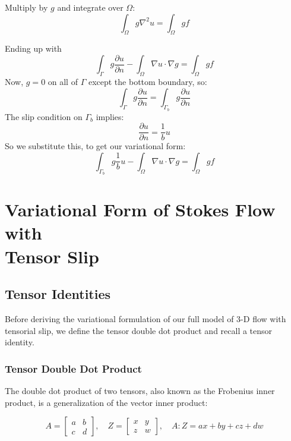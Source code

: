 \documentclass[12pt, a4paper, twoside, openright]{book}
\begin{document}
Multiply  by $g$ and integrate over $\Omega$:
\begin{equation}
\int_{\Omega} g \nabla^2 u = \int_{\Omega} g f
\end{equation}

Ending up with
\begin{equation}
\int_{\Gamma} g \frac{\partial u}{\partial n}
 - \int_{\Omega} \nabla u \cdot \nabla g  
= \int_{\Omega} g f
\end{equation}
Now, $g=0$ on all of $\Gamma$ except the bottom boundary, so:
\begin{equation}
\int_{\Gamma} g \frac{\partial u}{\partial n}
= \int_{\Gamma_b} g \frac{\partial u}{\partial n}
\end{equation}
The slip condition on $\Gamma_b$ implies:
\begin{equation}
\frac{\partial u}{\partial n} = \frac{1}{b}u
\end{equation}
So we substitute this, to get our variational form:
\begin{equation}
\int_{\Gamma_b} g \frac{1}{b} u 
 - \int_{\Omega} \nabla u \cdot \nabla g  
= \int_{\Omega} g f
\end{equation}


\section{Variational Form of Stokes Flow with\\ Tensor Slip}

\subsection{Tensor Identities}

Before deriving the variational formulation of our full model of 3-D flow with tensorial slip, we define the tensor double dot product and recall a tensor identity.

\subsubsection{Tensor Double Dot Product}

The double dot product of two tensors, also known as the Frobenius inner product, is a generalization of the vector inner product:

\begin{equation}
A = 
\begin{bmatrix}
a & b \\
c & d
\end{bmatrix}
, \quad Z = 
\begin{bmatrix}
x & y \\
z & w
\end{bmatrix}
, \quad
A:Z = ax + by + cz + dw
\end{equation}
\end{document}
